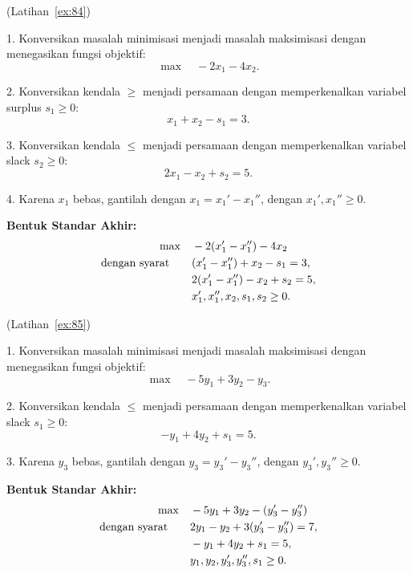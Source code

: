 \begin{solution}(Latihan~\ref{ex:84})

1. Konversikan masalah minimisasi menjadi masalah maksimisasi dengan menegasikan fungsi objektif:
   \[
   \max \quad -2x_1 - 4x_2.
   \]

2. Konversikan kendala \( \geq \) menjadi persamaan dengan memperkenalkan variabel surplus \( s_1 \geq 0 \):
   \[
   x_1 + x_2 - s_1 = 3.
   \]

3. Konversikan kendala \( \leq \) menjadi persamaan dengan memperkenalkan variabel slack \( s_2 \geq 0 \):
   \[
   2x_1 - x_2 + s_2 = 5.
   \]

4. Karena \( x_1 \) bebas, gantilah dengan \( x_1 = x_1' - x_1'' \), dengan \( x_1', x_1'' \geq 0 \).

\textbf{Bentuk Standar Akhir:}
\[
\begin{aligned}
    \max \quad & -2(x_1' - x_1'') - 4x_2 \\
    \mbox{dengan syarat}\quad \quad
    & (x_1' - x_1'') + x_2 - s_1 = 3, \\
    & 2(x_1' - x_1'') - x_2 + s_2 = 5, \\
    & x_1', x_1'', x_2, s_1, s_2 \geq 0.
\end{aligned}
\]
\end{solution}
\vspace{1cm}

\begin{solution}(Latihan~\ref{ex:85})

1. Konversikan masalah minimisasi menjadi masalah maksimisasi dengan menegasikan fungsi objektif:
   \[
   \max \quad -5y_1 + 3y_2 - y_3.
   \]

2. Konversikan kendala \( \leq \) menjadi persamaan dengan memperkenalkan variabel slack \( s_1 \geq 0 \):
   \[
   -y_1 + 4y_2 + s_1 = 5.
   \]

3. Karena \( y_3 \) bebas, gantilah dengan \( y_3 = y_3' - y_3'' \), dengan \( y_3', y_3'' \geq 0 \).

\textbf{Bentuk Standar Akhir:}
\[
\begin{aligned}
    \max \quad & -5y_1 + 3y_2 - (y_3' - y_3'') \\
    \mbox{dengan syarat}\quad \quad
    & 2y_1 - y_2 + 3(y_3' - y_3'') = 7, \\
    & -y_1 + 4y_2 + s_1 = 5, \\
    & y_1, y_2, y_3', y_3'', s_1 \geq 0.
\end{aligned}
\]
\end{solution}
\vspace{1cm}

